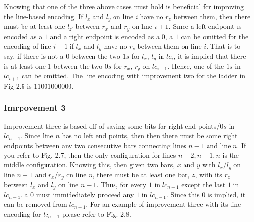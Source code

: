 Knowing that one of the three above cases must hold is beneficial for improving the 
line-based encoding. If $l_{x}$ and $l_{y}$ on line $i$ have no $r_{z}$ between them, 
then there must be at least one $l_{z\prime}$ between $r_{x}$ and $r_{y}$ on line $i+1$.
Since a left endpoint is encoded as a $1$ and a right endpoint is encoded as a $0$, 
a $1$ can be omitted for the encoding of line $i+1$ if $l_{x}$ and $l_{y}$ have no $r_{z}$
between them on line $i$. That is to say, if there is not a $0$ between 
the two  $1s$ for $l_{x}$, $l_{y}$ in $lc_{i}$, it is implied that there is at least one $1$ between 
the two $0s$ for $r_{x}$, $r_{y}$ on $lc_{i+1}$. Hence, one of the $1s$ in $lc_{i+1}$ can be omitted. 
The line encoding with improvement two for the ladder in Fig 2.6 is $11\underline{0}010\underline{0}00\underline{0}0$.
\subsubsection{Imrpovement 3}
Improvement three is based off of saving some bits for right 
end points/$0s$ in $lc_{n-1}$. Since line $n$ has no left end points,
then then there must be some right endpoints between any two 
consecutive bars connecting lines $n-1$ and line $n$. If you 
refer to Fig. 2.7, then the only configuration for lines $n-2, n-1, n$
is the middle configuration. Knowing this, then 
given two bars, $x$ and $y$ with $l_{x}$/$l_{y}$ on line 
$n-1$ and $r_{x}$/$r_{y}$ on line $n$, there must be at least 
one bar, $z$, with its $r_{z}$ between $l_{x}$ and $l_{y}$
on line $n-1$. Thus, for every $1$ in $lc_{n-1}$ except the 
last $1$ in $lc_{n-1}$, a $0$ must immidediately proceed any $1$
in $lc_{n-1}$. Since this $0$ is implied, it can be removed from $lc_{n-1}$. 
For an example of improvement three with its line encoding for $lc_{n-1}$ please refer to Fig. 2.8.\pagebreak
